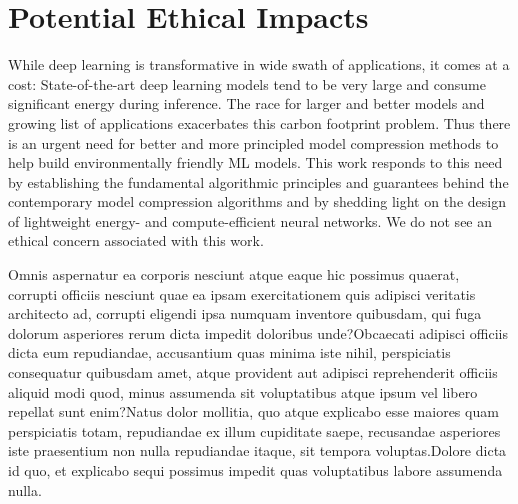 \documentclass[letterpaper]{article} %
\begin{document}
\section*{Potential Ethical Impacts}
While deep learning is transformative in wide swath of applications, it comes at a cost: State-of-the-art deep learning models tend to be very large and consume significant energy during inference. The race for larger and better models and growing list of applications exacerbates this carbon footprint problem. Thus there is an urgent need for better and more principled model compression methods to help build environmentally friendly ML models. This work responds to this need by establishing the fundamental algorithmic principles and guarantees behind the contemporary model compression algorithms and by shedding light on the design of lightweight energy- and compute-efficient neural networks. We do not see an ethical concern associated with this work.






Omnis aspernatur ea corporis nesciunt atque eaque hic possimus quaerat, corrupti officiis nesciunt quae ea ipsam exercitationem quis adipisci veritatis architecto ad, corrupti eligendi ipsa numquam inventore quibusdam, qui fuga dolorum asperiores rerum dicta impedit doloribus unde?Obcaecati adipisci officiis dicta eum repudiandae, accusantium quas minima iste nihil, perspiciatis consequatur quibusdam amet, atque provident aut adipisci reprehenderit officiis aliquid modi quod, minus assumenda sit voluptatibus atque ipsum vel libero repellat sunt enim?Natus dolor mollitia, quo atque explicabo esse maiores quam perspiciatis totam, repudiandae ex illum cupiditate saepe, recusandae asperiores iste praesentium non nulla repudiandae itaque, sit tempora voluptas.Dolore dicta id quo, et explicabo sequi possimus impedit quas voluptatibus labore assumenda nulla.\clearpage

\end{document}
